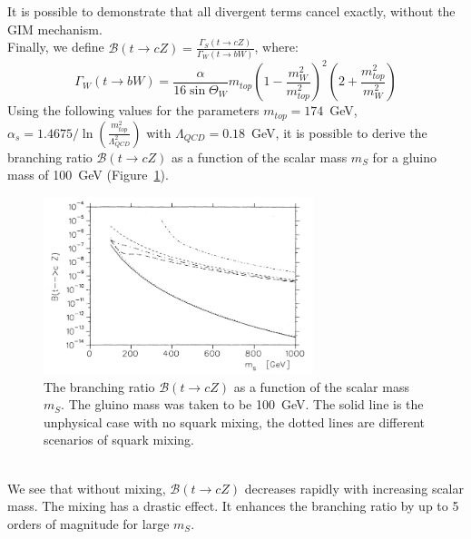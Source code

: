 It is possible to demonstrate that all divergent terms cancel exactly, without the GIM mechanism.\\
Finally, we define $\mathcal{B}(t \rightarrow cZ)=\frac{\Gamma_{S}(t \rightarrow cZ)}{\Gamma_{W}(t \rightarrow bW)}$, where:
\begin{equation} 
\Gamma_{W}(t \rightarrow bW) = \frac{\alpha}{16\sin{\Theta_W}} m_{top} \left(1-\frac{m^{2}_{W}}{m^{2}_{top}}\right)^2 \left(2+\frac{m^{2}_{top}}{m^{2}_{W}}\right)
\end{equation}
Using the following values for the parameters $m_{top}=174$~GeV, $\alpha_{s}=1.4675/\ln{\left( \frac{m^{2}_{top}}{\Lambda^{2}_{QCD}} \right)}$ with $\Lambda_{QCD}=0.18$~GeV, it is
possible to derive the branching ratio $\mathcal{B}(t \rightarrow cZ)$ as a function of the scalar mass $m_{S}$ for a gluino mass of 100~GeV (Figure~\ref{fig:BR_mssm}).
\begin{figure}[!h]
	\centering
	\includegraphics[width=0.7\textwidth]{Chapters/CH1/figures/BR_mssm}
	\caption{The branching ratio $\mathcal{B}(t \rightarrow cZ)$ as a function of the scalar mass $m_{S}$. The gluino mass was taken to be 100~GeV. The solid line is the unphysical case 
		with no squark mixing, the dotted lines are different scenarios of squark mixing\cite{coulture_mssm}.}
	\label{fig:BR_mssm}
\end{figure}
\\We see that without mixing, $\mathcal{B}(t \rightarrow cZ)$ decreases rapidly with increasing scalar mass. The mixing has a drastic effect. It enhances the branching ratio by up to 
5 orders of magnitude for large $m_{S}$.
\clearpage
\let\cleardoublepage\clearpage

